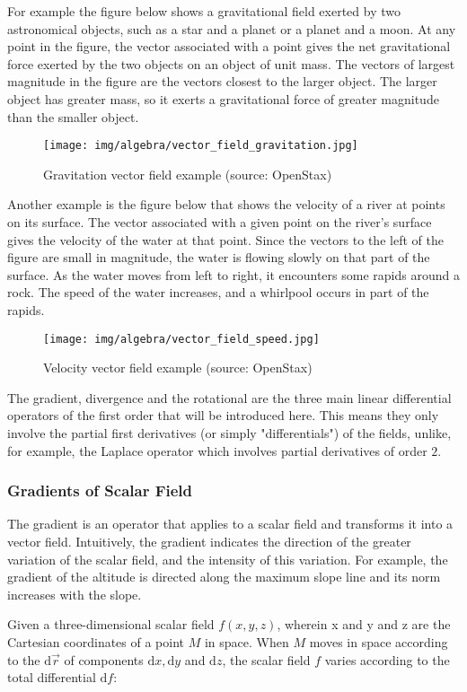 	For example the figure below shows a gravitational field exerted by two astronomical objects, such as a star and a planet or a planet and a moon. At any point in the figure, the vector associated with a point gives the net gravitational force exerted by the two objects on an object of unit mass. The vectors of largest magnitude in the figure are the vectors closest to the larger object. The larger object has greater mass, so it exerts a gravitational force of greater magnitude than the smaller object.
	\begin{figure}[H]
		\centering
		\texttt{[image: img/algebra/vector\_field\_gravitation.jpg]}
		\caption{Gravitation vector field example (source: OpenStax)}
	\end{figure}
	Another example is the figure below that shows the velocity of a river at points on its surface. The vector associated with a given point on the river's surface gives the velocity of the water at that point. Since the vectors to the left of the figure are small in magnitude, the water is flowing slowly on that part of the surface. As the water moves from left to right, it encounters some rapids around a rock. The speed of the water increases, and a whirlpool occurs in part of the rapids.
	\begin{figure}[H]
		\centering
		\texttt{[image: img/algebra/vector\_field\_speed.jpg]}
		\caption{Velocity vector field example (source: OpenStax)}
	\end{figure}
	The gradient, divergence and the rotational are the three main linear differential operators of the first order that will be introduced here. This means they only involve the partial first derivatives (or simply "differentials") of the fields, unlike, for example, the Laplace operator which involves partial derivatives of order $2$.	
	
	\pagebreak
	\subsubsection{Gradients of Scalar Field}
	The gradient is an operator that applies to a scalar field and transforms it into a vector field. Intuitively, the gradient indicates the direction of the greater variation of the scalar field, and the intensity of this variation. For example, the gradient of the altitude is directed along the maximum slope line and its norm increases with the slope.
	
	Given a three-dimensional scalar field $f(x,y,z)$, wherein x and y and z are the Cartesian coordinates of a point $M$ in space. When $M$ moves in space according to the $\mathrm{d}\vec{r}$ of components $\mathrm{d}x, \mathrm{d}y$ and $\mathrm{d}z$, the scalar field $f$ varies according to the total differential $\mathrm{d}f$:
	
